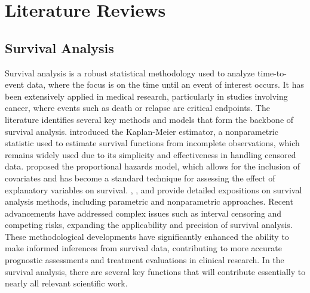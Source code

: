 \chapter{Literature Reviews}
\section{Survival Analysis}
Survival analysis is a robust statistical methodology used to analyze time-to-event data, where the focus is on the time until an event of interest occurs.
It has been extensively applied in medical research, particularly in studies involving cancer, where events such as death or relapse are critical endpoints.
The literature identifies several key methods and models that form the backbone of survival analysis. \citet{kaplan1958nonparametric} introduced the Kaplan-Meier estimator, a nonparametric statistic used to estimate survival functions from incomplete observations, which remains widely used due to its simplicity and effectiveness in handling censored data.
\citet{cox1972regression} proposed the proportional hazards model, which allows for the inclusion of covariates and has become a standard technique for assessing the effect of explanatory variables on survival.
\citet{collett2023modelling}, \citet{machin2006survival}, and \citet{kleinbaum1996survival} provide detailed expositions on survival analysis methods, including parametric and nonparametric approaches.
Recent advancements have addressed complex issues such as interval censoring and competing risks, expanding the applicability and precision of survival analysis.
These methodological developments have significantly enhanced the ability to make informed inferences from survival data, contributing to more accurate prognostic assessments and treatment evaluations in clinical research.
In the survival analysis, there are several key functions that will contribute essentially to nearly all relevant scientific work. 

